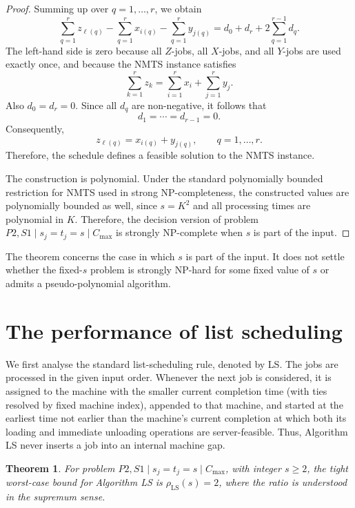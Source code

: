 \documentclass[11pt]{article}
\newtheorem{theorem}{Theorem}
\begin{document}
\begin{proof}
Summing up over \(q=1,\ldots,r\), we obtain
\[
\sum_{q=1}^r z_{\ell(q)}
-\sum_{q=1}^r x_{i(q)}
-\sum_{q=1}^r y_{j(q)}
=
d_0+d_r+2\sum_{q=1}^{r-1}d_q.
\]
The left-hand side is zero because all \(Z\)-jobs, all \(X\)-jobs, and all \(Y\)-jobs are
used exactly once, and because the NMTS instance satisfies
\[
\sum_{k=1}^r z_k=\sum_{i=1}^r x_i+\sum_{j=1}^r y_j.
\]
Also \(d_0=d_r=0\). Since all \(d_q\) are non-negative, it follows that
\[
d_1=\cdots=d_{r-1}=0.
\]
Consequently,
\[
z_{\ell(q)}=x_{i(q)}+y_{j(q)},\qquad q=1,\ldots,r.
\]
Therefore, the schedule defines a feasible solution to the NMTS instance.

The construction is polynomial. Under the standard polynomially bounded restriction
for NMTS used in strong NP-completeness, the constructed values are polynomially
bounded as well, since \(s=K^2\) and all processing times are polynomial in \(K\).
Therefore, the decision version of problem  \(P2,S1\mid s_j=t_j=s\mid C_{\max}\)
is strongly NP-complete when \(s\) is part of the input.
\end{proof}

The theorem concerns the case in which \(s\) is part of the input. It does not
settle whether the fixed-\(s\) problem is strongly NP-hard for some fixed value of
\(s\) or admits a pseudo-polynomial algorithm.







\section{The performance of list scheduling}
\label{sec:ls_equal_s}

We first analyse the standard list-scheduling rule, denoted by LS. The jobs are
processed in the given input order. Whenever the next job is considered, it is
assigned to the machine with the smaller current completion time (with ties resolved
by fixed machine index), appended to that machine, and started at the earliest time
not earlier than the machine's current completion at which both its loading and
immediate unloading operations are server-feasible. Thus, Algorithm  LS never inserts a job into
an internal machine gap.

\begin{theorem}
\label{thm:ls_ratio_equal_s}
For problem \(P2,S1\mid s_j=t_j=s\mid C_{\max}\), with integer \(s\ge2\), the tight
worst-case bound for Algorithm LS is \(\rho_{\mathrm{LS}}(s)=2\),
where the ratio is understood in the supremum sense.
\end{theorem}
\end{document}
